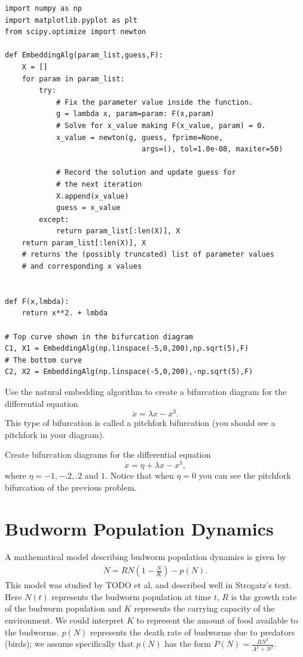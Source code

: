 \begin{lstlisting}
import numpy as np
import matplotlib.pyplot as plt
from scipy.optimize import newton

def EmbeddingAlg(param_list,guess,F):
	X = []
	for param in param_list:
		try:
			# Fix the parameter value inside the function.
			g = lambda x, param=param: F(x,param)
			# Solve for x_value making F(x_value, param) = 0.
			x_value = newton(g, guess, fprime=None, 
								args=(), tol=1.0e-08, maxiter=50)
			
			# Record the solution and update guess for 
			# the next iteration
			X.append(x_value)
			guess = x_value 
		except:
			return param_list[:len(X)], X	
	return param_list[:len(X)], X   		
	# returns the (possibly truncated) list of parameter values 
	# and corresponding x values


def F(x,lmbda):
	return x**2. + lmbda

# Top curve shown in the bifurcation diagram
C1, X1 = EmbeddingAlg(np.linspace(-5,0,200),np.sqrt(5),F)
# The bottom curve
C2, X2 = EmbeddingAlg(np.linspace(-5,0,200),-np.sqrt(5),F)
\end{lstlisting}


\begin{problem}
Use the natural embedding algorithm to create a bifurcation diagram for the differential equation
\[\dot{x} = \lambda x-x^3.\]
This type of bifurcation is called a pitchfork bifurcation (you should see a pitchfork in your diagram).
\end{problem}

\begin{problem}
Create bifurcation diagrams for the differential equation
\[\dot{x} = \eta + \lambda x-x^3,\]
where $\eta = -1, -.2, .2$ and $1.$ Notice that when $\eta = 0$ you can see the pitchfork bifurcation of the previous problem.
\end{problem}

\section{Budworm Population Dynamics}
A mathematical model describing budworm population dynamics is given by 
\begin{align}
\dot{N} = RN\left(1 - \frac{N}{K}\right) - p(N). \label{budworm1}
\end{align}
This model was studied by TODO et al, and described well in Strogatz's text. Here $N(t)$ represents the budworm population at time $t$, $R$ is the growth rate of the budworm population and $K$ represents the carrying capacity of the environment. We could interpret $K$ to represent the amount of food available to the budworms. 
$p(N)$ represents the death rate of budworms due to predators (birds); we assume specifically that $p(N)$ has the form $P(N) = \frac{BN^2}{A^2 + N^2}$.

